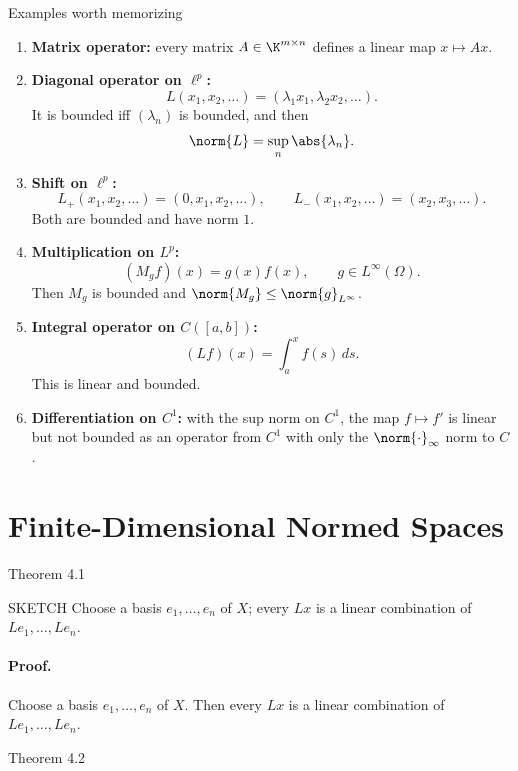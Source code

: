 \documentclass[header={Lecture 2 Exam Study Notes}]{study-note}
\begin{document}
\begin{exbox}{Examples worth memorizing}
\begin{enumerate}
\item \textbf{Matrix operator:} every matrix $A\in\K^{m\times n}$ defines a linear map $x\mapsto Ax$.
\item \textbf{Diagonal operator on $\ell^p$:}
\[
L(x_1,x_2,\dots)=(\lambda_1x_1,\lambda_2x_2,\dots).
\]
It is bounded iff $(\lambda_n)$ is bounded, and then
\[
\norm{L}=\sup_n \abs{\lambda_n}.
\]
\item \textbf{Shift on $\ell^p$:}
\[
L_+(x_1,x_2,\dots)=(0,x_1,x_2,\dots),
\qquad
L_-(x_1,x_2,\dots)=(x_2,x_3,\dots).
\]
Both are bounded and have norm $1$.
\item \textbf{Multiplication on $L^p$:}
\[
(M_gf)(x)=g(x)f(x), \qquad g\in L^\infty(\Omega).
\]
Then $M_g$ is bounded and $\norm{M_g}\le \norm{g}_{L^\infty}$.
\item \textbf{Integral operator on $C([a,b])$:}
\[
(Lf)(x)=\int_a^x f(s)\,ds.
\]
This is linear and bounded.
\item \textbf{Differentiation on $C^1$:} with the sup norm on $C^1$, the map $f\mapsto f'$ is linear but not bounded as an operator from $C^1$ with only the $\norm{\cdot}_\infty$ norm to $C$.
\end{enumerate}
\end{exbox}

\section{Finite-Dimensional Normed Spaces}

\begin{thmbox}{Theorem 4.1}
\thmFiniteDimRange
\end{thmbox}

\begin{prooflevelbox}{SKETCH}
Choose a basis $e_1,\dots,e_n$ of $X$; every $Lx$ is a linear combination of $Le_1,\dots,Le_n$.
\end{prooflevelbox}

\paragraph{Proof.}
Choose a basis $e_1,\dots,e_n$ of $X$. Then every $Lx$ is a linear combination of $Le_1,\dots,Le_n$.

\begin{thmbox}{Theorem 4.2}
\thmFiniteDimBounded
\end{thmbox}
\end{document}
